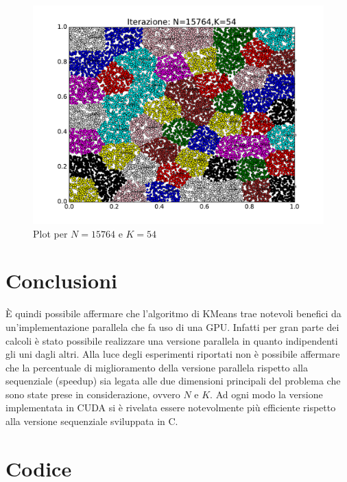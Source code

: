\documentclass[10pt,twocolumn,letterpaper]{article}
\begin{document}
\begin{figure}[H]
  \centering
    \includegraphics[width=\columnwidth]{Image/test3.pdf}
  \caption{Plot per $N=15764$ e $K=54$}
  \label{fig:test3}
\end{figure}


\section{Conclusioni}
È quindi possibile affermare che l'algoritmo di KMeans trae notevoli benefici da un'implementazione parallela che fa uso di una GPU. Infatti per gran parte dei calcoli è stato possibile realizzare una versione parallela in quanto indipendenti gli uni dagli altri. Alla luce degli esperimenti riportati non è possibile affermare che la percentuale di miglioramento della versione parallela rispetto alla sequenziale (speedup) sia legata alle due dimensioni principali del problema che sono state prese in considerazione, ovvero $N$ e $K$. Ad ogni modo la versione implementata in CUDA si è rivelata essere notevolmente più efficiente rispetto alla versione sequenziale sviluppata in C.
\vspace{3cm}

\appendix
\section{Codice}

{}

\end{document}
